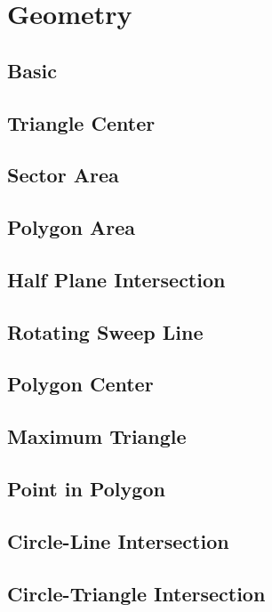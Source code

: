 \documentclass[a4paper,10pt,twocolumn,oneside]{article}
\begin{document}
\section{Geometry}
\subsection{Basic}

\subsection{Triangle Center}

\subsection{Sector Area}

\subsection{Polygon Area}

\subsection{Half Plane Intersection}

\subsection{Rotating Sweep Line}

\subsection{Polygon Center}

\subsection{Maximum Triangle}

\subsection{Point in Polygon}

\subsection{Circle-Line Intersection}

\subsection{Circle-Triangle Intersection}

\end{document}
